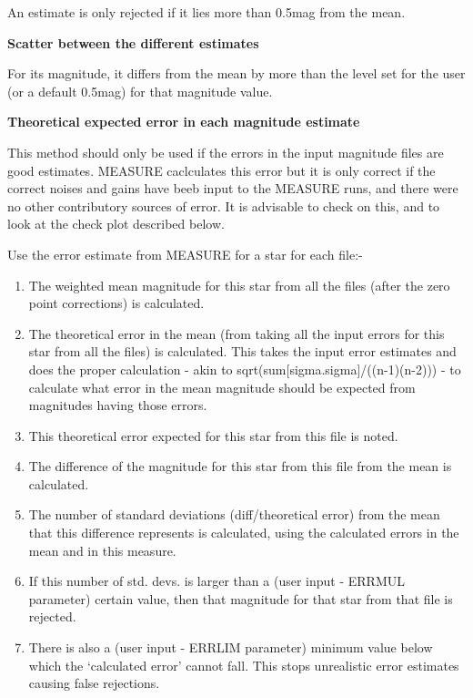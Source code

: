 \begin{small}
{{\begin{list}{{---}}{}
      An estimate is only rejected if it lies more than 0.5mag from the
      mean.
 
  \item {\bf Scatter between the different estimates}
 
      For its magnitude, it differs from the mean by more than the
      level set for the user (or a default 0.5mag) for that magnitude
      value.
 
  \item {\bf Theoretical expected error in each magnitude estimate}
 
      This method should only be used if the errors in the input
      magnitude files are good estimates. MEASURE caclculates this
      error but it is only correct if the correct noises and gains
      have beeb input to the MEASURE runs, and there were no other
      contributory sources of error. It is advisable to check on
      this, and to look at the check plot described below.
 
      Use the error estimate from MEASURE for a star for each file:-
 
      \begin{enumerate}
      \item The weighted mean magnitude for this star from all the files
         (after the zero point corrections) is calculated.
      \item The theoretical error in the mean (from taking all the input
         errors for this star from all the files) is calculated. This
         takes the input error estimates and does the proper
         calculation - akin to sqrt(sum[sigma.sigma]/((n-1)(n-2))) - to
         calculate what error in the mean magnitude should be expected
         from magnitudes having those errors.
      \item This theoretical error expected for this star from this file
         is noted.
      \item The difference of the magnitude for this star from this file
         from the mean is calculated.
      \item The number of standard deviations (diff/theoretical error)
         from the mean that this difference represents is calculated,
         using the calculated errors in the mean and in this measure.
      \item If this number of std. devs. is larger than a (user input -
         ERRMUL parameter) certain value, then that magnitude for that
         star from that file is rejected.
      \item There is also a (user input - ERRLIM parameter) minimum value
         below which the `calculated error' cannot fall. This stops
         unrealistic error estimates causing false rejections.
      \end{enumerate}
 

\end{list}}}
\end{small}
